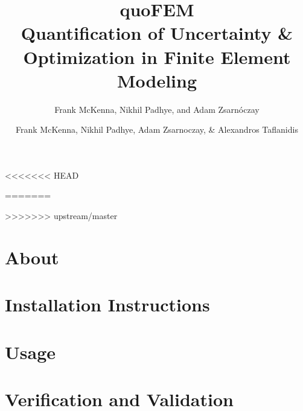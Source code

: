 \documentclass{simcenterdocumentation}
\begin{document}
\title{quoFEM\\ \Large Quantification of Uncertainty \& Optimization in Finite Element Modeling}
<<<<<<< HEAD
\author{Frank McKenna, Nikhil Padhye, and Adam Zsarn\'oczay}

=======
\author{Frank McKenna, Nikhil Padhye, Adam Zsarnoczay, \& Alexandros Taflanidis}
>>>>>>> upstream/master

\hypersetup{pageanchor=false}
\maketitle
\copyrightpage
\acknowledgments

\hypersetup{pageanchor=true}
\begin{frontmatter}

\pagestyle{plain}
{
  \renewcommand{\thispagestyle}[1]{}
  \tableofcontents
  \clearpage
  \listoffigures
  \clearpage
  \listoftables
}

\end{frontmatter}
\pagestyle{somewhatsimple}

\chapter{About}
\label{chap:about}


\chapter{Installation Instructions}
\label{chap:installation}


\chapter{Usage}
\label{chap:usage}


\chapter{Verification and Validation}
\label{chap:vnv}

\end{document}
